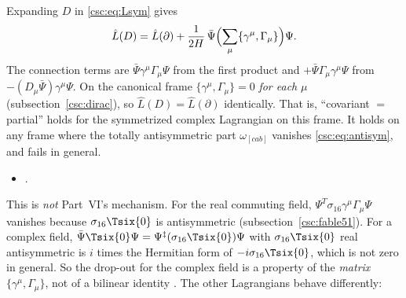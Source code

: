 \label{sec:3.8.12.2}

Expanding $D$ in \eqref{csc:eq:Lsym} gives \cfderived
\begin{equation}
  \hat L(D)=\hat L(\partial)+\frac{1}{2H}\,\bar\Psi\Bigl(\sum_\mu\{\gamma^\mu,\Gamma_\mu\}\Bigr)\Psi .
\end{equation}
The connection terms are $\bar\Psi\gamma^\mu\Gamma_\mu\Psi$ from the first product and
$+\bar\Psi\Gamma_\mu\gamma^\mu\Psi$ from $-(D_\mu\bar\Psi)\gamma^\mu\Psi$. On the canonical frame
$\{\gamma^\mu,\Gamma_\mu\}=0$ \emph{for each} $\mu$ (subsection~\ref{csc:dirac}), so
$\hat L(D)=\hat L(\partial)$ identically. That is, ``covariant $=$ partial'' holds for the
symmetrized complex Lagrangian on this frame. It holds on any frame where the totally antisymmetric
part $\omega_{[cab]}$ vanishes \eqref{csc:eq:antisym}, and fails in general.
\begin{itemize}
  \item {} .
\end{itemize}
This is \emph{not} Part~VI's mechanism. For the real commuting field,
$\Psi^T\sigma_{16}\gamma^\mu\Gamma_\mu\Psi$ vanishes because $\sigma_{16}\Tsix{0}$ is antisymmetric
(subsection~\ref{csc:fable51}). For a complex field,
$\bar\Psi\Tsix{0}\Psi=\Psi^\ddagger(\sigma_{16}\Tsix{0})\Psi$ with $\sigma_{16}\Tsix{0}$ real
antisymmetric is $i$ times the Hermitian form of $-i\sigma_{16}\Tsix{0}$, which is not zero in
general. So the drop-out for the complex field is a property of the \emph{matrix}
$\{\gamma^\mu,\Gamma_\mu\}$, not of a bilinear identity \cfderived. The other Lagrangians behave
differently:
